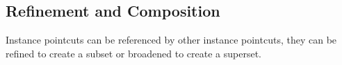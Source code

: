 \documentclass{llncs}
\begin{document}



\subsection{Refinement and Composition}

Instance pointcuts can be referenced by other instance pointcuts, they can be refined to create a subset or broadened to create a superset. 
\end{document}
